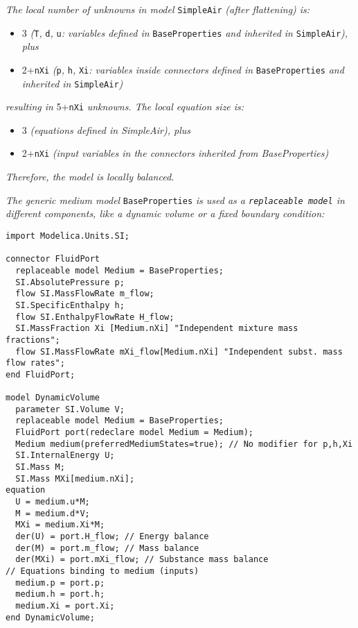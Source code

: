 \emph{The local number of unknowns in model} \lstinline!SimpleAir! \emph{(after
flattening) is:}

\begin{itemize}
\item
  3 \emph{(}\lstinline!T!\emph{,} \lstinline!d!\emph{,} \lstinline!u!\emph{: variables defined in}
  \lstinline!BaseProperties! \emph{and inherited in} \lstinline!SimpleAir!\emph{), plus}
\item
  2+\lstinline!nXi! \emph{(}\lstinline!p!\emph{,} \lstinline!h!\emph{,}
	\lstinline!Xi!\emph{: variables inside
  connectors defined in} \lstinline!BaseProperties! \emph{and inherited in}
  \lstinline!SimpleAir!\emph{)}
\end{itemize}

\emph{resulting in} 5+\lstinline!nXi! \emph{unknowns. The local equation size
is:}

\begin{itemize}
\item
  3 \emph{(equations defined in SimpleAir), plus}
\item
  2+\lstinline!nXi! \emph{(input variables in the connectors inherited from
  BaseProperties)}
\end{itemize}

\emph{Therefore, the model is locally balanced. }

\emph{The generic medium model} \lstinline!BaseProperties! \emph{is used as a
\lstinline!replaceable model! in different components, like a dynamic
volume or a fixed boundary condition:}

\begin{lstlisting}[language=modelica]
import Modelica.Units.SI;

connector FluidPort
  replaceable model Medium = BaseProperties;
  SI.AbsolutePressure p;
  flow SI.MassFlowRate m_flow;
  SI.SpecificEnthalpy h;
  flow SI.EnthalpyFlowRate H_flow;
  SI.MassFraction Xi [Medium.nXi] "Independent mixture mass fractions";
  flow SI.MassFlowRate mXi_flow[Medium.nXi] "Independent subst. mass flow rates";
end FluidPort;

model DynamicVolume
  parameter SI.Volume V;
  replaceable model Medium = BaseProperties;
  FluidPort port(redeclare model Medium = Medium);
  Medium medium(preferredMediumStates=true); // No modifier for p,h,Xi
  SI.InternalEnergy U;
  SI.Mass M;
  SI.Mass MXi[medium.nXi];
equation
  U = medium.u*M;
  M = medium.d*V;
  MXi = medium.Xi*M;
  der(U) = port.H_flow; // Energy balance
  der(M) = port.m_flow; // Mass balance
  der(MXi) = port.mXi_flow; // Substance mass balance
// Equations binding to medium (inputs)
  medium.p = port.p;
  medium.h = port.h;
  medium.Xi = port.Xi;
end DynamicVolume;
\end{lstlisting}

